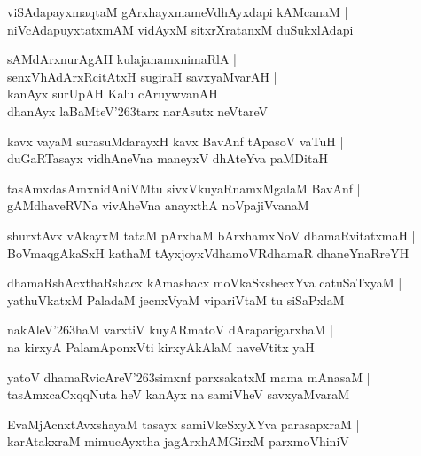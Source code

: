 \documentclass[twoside,12pt,openright]{book}
\def\S{\char'263}
\newcounter{shloka}[chapter]
\begin{document}
\begin{shloka}
viSAdapayxmaqtaM gArxhayxmameVdhAyxdapi kAMcanaM |\\
niVcAdapuyxtatxmAM vidAyxM sitxrXratanxM duSukxlAdapi 
\end{shloka}

\begin{shloka}
sAMdArxnurAgAH kulajanamxnimaRlA |\\
senxVhAdArxRcitAtxH sugiraH savxyaMvarAH |\\
kanAyx surUpAH Kalu cAruywvanAH \\
dhanAyx laBaMteV\S tarx narAsutx neVtareV 
\end{shloka}

\begin{shloka}
kavx vayaM surasuMdarayxH kavx BavAnf tApasoV vaTuH |\\
duGaRTasayx vidhAneVna maneyxV dhAteYva paMDitaH
\end{shloka}

\begin{shloka}
tasAmxdasAmxnidAniVMtu sivxVkuyaRnamxMgalaM BavAnf |\\
gAMdhaveRVNa vivAheVna anayxthA noVpajiVvanaM 
\end{shloka}

\begin{shloka}
shurxtAvx vAkayxM  tataM pArxhaM bArxhamxNoV dhamaRvitatxmaH |\\
BoVmaqgAkaSxH kathaM tAyxjoyxVdhamoVRdhamaR dhaneYnaRreYH 
\end{shloka}

\begin{shloka}
dhamaRshAcxthaRshacx kAmashacx moVkaSxshecxYva catuSaTxyaM |\\
yathuVkatxM PaladaM jecnxVyaM vipariVtaM tu siSaPxlaM 
\end{shloka}


\begin{shloka}
nakAleV\S haM varxtiV kuyARmatoV dAraparigarxhaM |\\
na kirxyA PalamAponxVti kirxyAkAlaM naveVtitx yaH 
\end{shloka}

\begin{shloka}
yatoV dhamaRvicAreV\S simxnf parxsakatxM mama mAnasaM |\\
tasAmxcaCxqqNuta heV kanAyx na samiVheV savxyaMvaraM 
\end{shloka}

\begin{shloka}
EvaMjAcnxtAvxshayaM tasayx samiVkeSxyXYva parasapxraM |\\
karAtakxraM mimucAyxtha jagArxhAMGirxM parxmoVhiniV 
\end{shloka}
\end{document}
